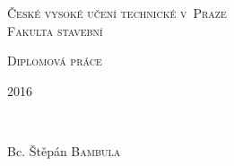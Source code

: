 \documentclass[a4paper,12pt,oneside]{book}
\begin{document}
\begin{titlepage}
 
\newcommand{\HRule}{\rule{\linewidth}{0.5mm}} %

\center %


\textsc{\LARGE České vysoké učení technické v~Praze}\\[0.5cm] %
\textsc{\Large Fakulta stavební} %



\vfill

\textsc{\LARGE Diplomová práce}

\vfill
\begin{minipage}{0.4\textwidth}
\begin{flushleft} 
\large 2016	%
\end{flushleft}
\end{minipage}
~
\begin{minipage}{0.4\textwidth}
\begin{flushright} 
\large Bc. Štěpán \textsc{Bambula} \\ %
\end{flushright}
\end{minipage}\\[1cm]

\end{titlepage}


\end{document}
